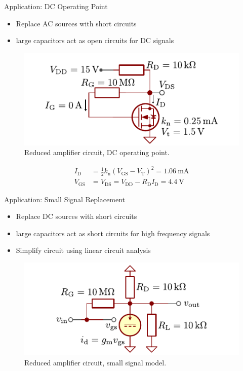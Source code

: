 \begin{frame}{Application: DC Operating Point}
    \begin{itemize}
        \item Replace AC sources with short circuits
        \item large capacitors act as open circuits for DC signals
    \end{itemize}
    \begin{figure}
        \centering
        \includegraphics{../assets/example_circuit_dc.pdf}
        \caption{Reduced amplifier circuit, DC operating point.}
        \label{fig:mosfet_amplifier_dc}
    \end{figure}
    \begin{align*}
        I_{\mathrm{D}}&=\frac{1}{2}k_{\mathrm{n}}(V_{\mathrm{GS}}-V_{\mathrm{T}})^{2} 
        = \qty{1.06}{\milli \ampere}\\
        V_{\mathrm{GS}}&=V_{\mathrm{DS}}=V_{\mathrm{DD}}-R_{\mathrm{D}}I_{\mathrm{D}}
        =\qty{4.4}{\volt}
    \end{align*}
\end{frame}

\begin{frame}{Application: Small Signal Replacement}
    \begin{itemize}
        \item Replace DC sources with short circuits
        \item large capacitors act as short circuits for high frequency signals
        \item Simplify circuit using linear circuit analysis
    \end{itemize}
    \begin{figure}
        \centering
        \includegraphics{../assets/mosfet_amplifier_small_signal.pdf}
        \caption{Reduced amplifier circuit, small signal model.}
        \label{fig:mosfet_amplifier_ac}
    \end{figure}
\end{frame}

